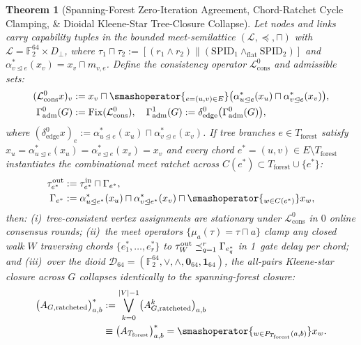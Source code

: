 \documentclass[11pt,letterpaper]{article}
\let\bigsqcap\relax
\newcommand{\bigsqcap}{\mathop{\vphantom{\bigcap}\mathchoice
  {\vcenter{\hbox{\huge$\sqcap$}}}
  {\vcenter{\hbox{\Large$\sqcap$}}}
  {\vcenter{\hbox{\normalsize$\sqcap$}}}
  {\vcenter{\hbox{\small$\sqcap$}}}}\displaylimits}
\theoremstyle{spectralthm}
\newtheorem{theorem}{Theorem}[section]
\begin{document}
\begin{theorem}[Spanning-Forest Zero-Iteration Agreement, Chord-Ratchet Cycle Clamping, \& Dioidal Kleene-Star Tree-Closure Collapse]
\label{thm:agreement}
Let nodes and links carry capability tuples in the bounded meet-semilattice $(\mathcal{L}, \preceq, \sqcap)$ with $\mathcal{L} = \mathbb{F}_2^{64} \times D_\perp$, where $\tau_1 \sqcap \tau_2 := [(r_1 \wedge r_2) \parallel (\mathrm{SPID}_1 \wedge_{\mathrm{flat}} \mathrm{SPID}_2)]$ and $\alpha_{v \trianglelefteq e}^*(x_v) = x_v \sqcap m_{v,e}$. Define the consistency operator $\mathcal{L}_{\mathrm{cons}}^0$ and admissible sets:
\begin{equation}
\label{eq:cons}
\begin{aligned}
(\mathcal{L}_{\mathrm{cons}}^0 x)_v &:= x_v \sqcap \smashoperator{\bigsqcap_{e=(u,v) \in E}} \bigl(\alpha_{u \trianglelefteq e}^*(x_u) \sqcap \alpha_{v \trianglelefteq e}^*(x_v)\bigr),\\
\Gamma_{\mathrm{adm}}^0(G) &:= \mathrm{Fix}(\mathcal{L}_{\mathrm{cons}}^0), \quad
\Gamma_{\mathrm{adm}}^1(G) := \delta_{\mathrm{edge}}^0\bigl(\Gamma_{\mathrm{adm}}^0(G)\bigr),
\end{aligned}
\end{equation}
where $(\delta_{\mathrm{edge}}^0 x)_e := \alpha_{u \trianglelefteq e}^*(x_u) \sqcap \alpha_{v \trianglelefteq e}^*(x_v)$. If tree branches $e \in T_{\mathrm{forest}}$ satisfy $x_u = \alpha_{u \trianglelefteq e}^*(x_u) = \alpha_{v \trianglelefteq e}^*(x_v) = x_v$ and every chord $e^* = (u,v) \in E \setminus T_{\mathrm{forest}}$ instantiates the combinational meet ratchet across $C(e^*) \subset T_{\mathrm{forest}} \cup \{e^*\}$:
\begin{equation}
\label{eq:chord_ratchet}
\begin{aligned}
\tau_{e^*}^{\mathrm{out}} &:= \tau_{e^*}^{\mathrm{in}} \sqcap \Gamma_{e^*},\\
\Gamma_{e^*} &:= \alpha_{u \trianglelefteq e^*}^*(x_u) \sqcap \alpha_{v \trianglelefteq e^*}^*(x_v) \sqcap \smashoperator{\bigsqcap_{w \in C(e^*)}} x_w,
\end{aligned}
\end{equation}
then: (i)~tree-consistent vertex assignments are stationary under $\mathcal{L}_{\mathrm{cons}}^0$ in $0$ online consensus rounds; (ii)~the meet operators $\{\mu_a(\tau) = \tau \sqcap a\}$ clamp any closed walk $W$ traversing chords $\{e_1^*,\ldots,e_r^*\}$ to $\tau_W^{\mathrm{out}} \preceq \bigsqcap_{q=1}^r \Gamma_{e_q^*}$ in 1~gate delay per chord; and (iii)~over the dioid $\mathcal{D}_{64} = (\mathbb{F}_2^{64}, \vee, \wedge, \mathbf{0}_{64}, \mathbf{1}_{64})$, the all-pairs Kleene-star closure across $G$ collapses identically to the spanning-forest closure:
\begin{equation}
\label{eq:kleene_collapse}
\begin{aligned}
\bigl(A_{G,\mathrm{ratcheted}}\bigr)_{a,b}^*
&:= \bigvee_{k=0}^{|V|-1} \bigl(A_{G,\mathrm{ratcheted}}^k\bigr)_{a,b}\\
&\equiv \bigl(A_{T_{\mathrm{forest}}}\bigr)_{a,b}^* = \smashoperator{\bigsqcap_{w \in P_{T_{\mathrm{forest}}}(a,b)}} x_w.
\end{aligned}
\end{equation}
\end{theorem}
\end{document}
